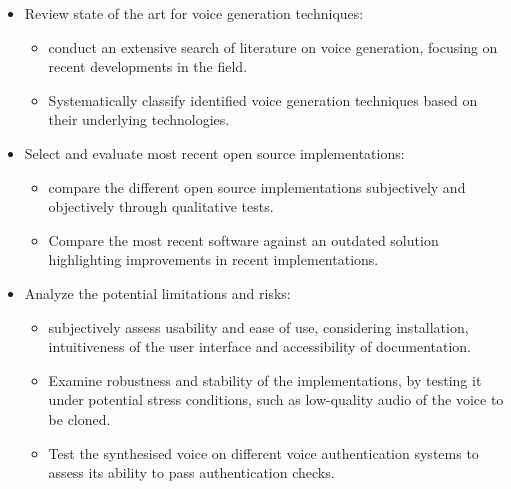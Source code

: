 \begin{itemize}
    \item Review state of the art for voice generation techniques:
    \begin{itemize}
        \item conduct an extensive search of literature on voice generation, focusing on recent developments in the field.
        \item Systematically classify identified voice generation techniques based on their underlying technologies. 
    \end{itemize}
    \item Select and evaluate most recent open source implementations:
    \begin{itemize}
        \item compare the different open source implementations subjectively and objectively through qualitative tests. 
        \item Compare the most recent software against an outdated solution highlighting improvements in recent implementations.
    \end{itemize}
    \item Analyze the potential limitations and risks:
    \begin{itemize}
        \item subjectively assess usability and ease of use, considering installation, intuitiveness of the user interface and accessibility of documentation.
        \item Examine robustness and stability of the implementations, by testing it under potential stress conditions, such as low-quality audio of the voice to be cloned.
        \item Test the synthesised voice on different voice authentication systems to assess its ability to pass authentication checks.
    \end{itemize}
\end{itemize}